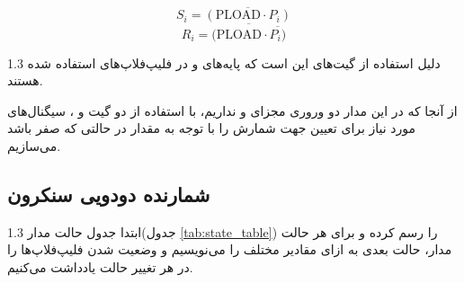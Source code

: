 \documentclass[a4paper,12pt]{article}
\numberwithin{figure}{subsection}
\begin{document}
$$ S_i = \overline{(\text{PLOAD} \cdot P_i)}$$
$$ R_i = \overline{(\text{PLOAD} \cdot \overline{P_i)}}$$

\begin{spacing}{1.3}
دلیل استفاده از گیت‌های  این است که پایه‌های  و  در فلیپ‌فلاپ‌های استفاده شده\\  هستند.

از آنجا که در این مدار دو وروری مجزای  و  نداریم، با استفاده از دو گیت  و ، سیگنال‌های مورد نیاز برای تعیین جهت شمارش را با توجه به مقدار  در حالتی که  صفر باشد می‌سازیم.
\end{spacing}

\subsection{شمارنده دودویی سنکرون}
\leavevmode\par
\vspace{0.2cm}

\begin{spacing}{1.3}
ابتدا جدول حالت مدار(جدول \ref{tab:state_table}) را رسم کرده و برای هر حالت مدار، حالت بعدی به ازای مقادیر مختلف  را می‌نویسیم و وضعیت  شدن فلیپ‌فلاپ‌ها را در هر تغییر حالت یادداشت می‌کنیم.
\end{spacing}
\end{document}
